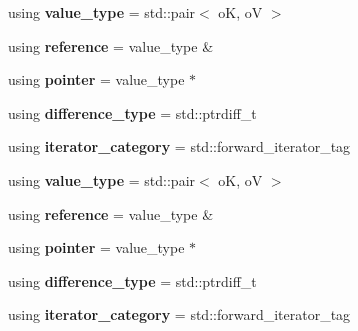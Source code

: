 \begin{DoxyCompactItemize}
\item 
\mbox{\label{classbst_1_1__iterator_acc5005b74056aea24fe3c9be60f6c1f2}} 
using {\bfseries value\+\_\+type} = std\+::pair$<$ oK, oV $>$
\item 
\mbox{\label{classbst_1_1__iterator_a60b8ecc0e10901d4682e15bffda82891}} 
using {\bfseries reference} = value\+\_\+type \&
\item 
\mbox{\label{classbst_1_1__iterator_a549eaeee82047e8d06275b575d735186}} 
using {\bfseries pointer} = value\+\_\+type $\ast$
\item 
\mbox{\label{classbst_1_1__iterator_ab559982e6da98a8b65bb10b180341d2f}} 
using {\bfseries difference\+\_\+type} = std\+::ptrdiff\+\_\+t
\item 
\mbox{\label{classbst_1_1__iterator_afb059a44adebd0d12bcc1d1013f0752f}} 
using {\bfseries iterator\+\_\+category} = std\+::forward\+\_\+iterator\+\_\+tag
\item 
\mbox{\label{classbst_1_1__iterator_ad645f0414a4138b43bcd1497188846d4}} 
using {\bfseries value\+\_\+type} = std\+::pair$<$ oK, oV $>$
\item 
\mbox{\label{classbst_1_1__iterator_a60b8ecc0e10901d4682e15bffda82891}} 
using {\bfseries reference} = value\+\_\+type \&
\item 
\mbox{\label{classbst_1_1__iterator_a549eaeee82047e8d06275b575d735186}} 
using {\bfseries pointer} = value\+\_\+type $\ast$
\item 
\mbox{\label{classbst_1_1__iterator_ab559982e6da98a8b65bb10b180341d2f}} 
using {\bfseries difference\+\_\+type} = std\+::ptrdiff\+\_\+t
\item 
\mbox{\label{classbst_1_1__iterator_afb059a44adebd0d12bcc1d1013f0752f}} 
using {\bfseries iterator\+\_\+category} = std\+::forward\+\_\+iterator\+\_\+tag
\end{DoxyCompactItemize}
